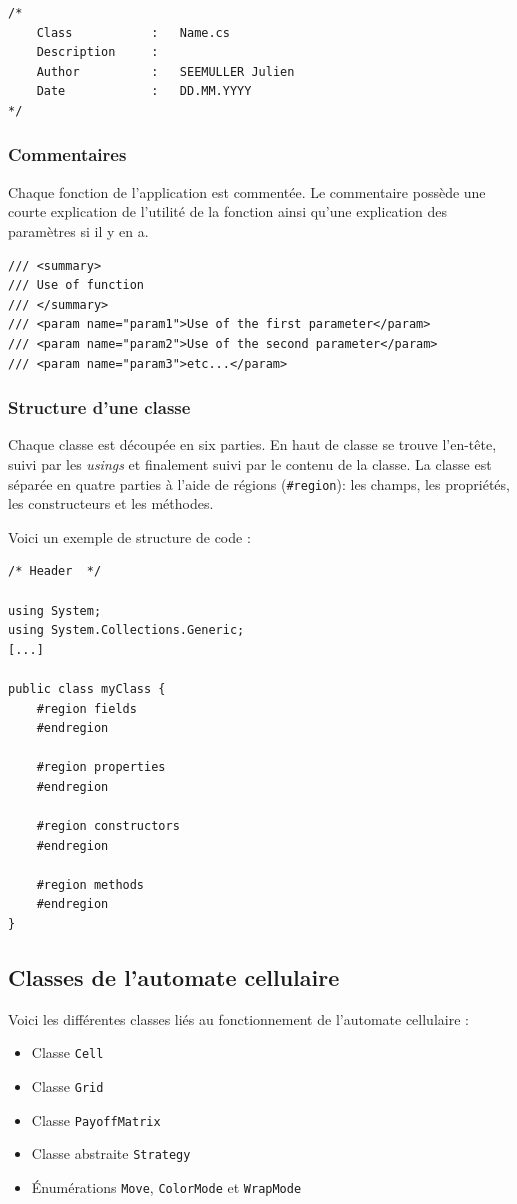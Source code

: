 \documentclass[a4paper]{article}
\begin{document}
\begin{lstlisting}
/*
    Class           :   Name.cs
    Description     :   
    Author          :   SEEMULLER Julien
    Date            :   DD.MM.YYYY
*/
\end{lstlisting}

\subsubsection{Commentaires}
Chaque fonction de l'application est commentée. Le commentaire possède une courte explication de l'utilité de la fonction ainsi qu'une explication des paramètres si il y en a.

\begin{lstlisting}
/// <summary>
/// Use of function
/// </summary>
/// <param name="param1">Use of the first parameter</param>
/// <param name="param2">Use of the second parameter</param>
/// <param name="param3">etc...</param>
\end{lstlisting}

\subsubsection{Structure d'une classe}
Chaque classe est découpée en six parties. En haut de classe se trouve l'en-tête, suivi par les \textit{usings} et finalement suivi par le contenu de la classe. La classe est séparée en quatre parties à l'aide de régions (\texttt{\#region}): les champs, les propriétés, les constructeurs et les méthodes.

Voici un exemple de structure de code :

\begin{lstlisting}
/* Header  */

using System;
using System.Collections.Generic;
[...]

public class myClass {
    #region fields
    #endregion
    
    #region properties
    #endregion
    
    #region constructors
    #endregion
    
    #region methods
    #endregion
}
\end{lstlisting}

\pagebreak
\subsection{Classes de l'automate cellulaire}
Voici les différentes classes liés au fonctionnement de l'automate cellulaire :
\begin{itemize}
    \item Classe \texttt{Cell}
    \item Classe \texttt{Grid}
    \item Classe \texttt{PayoffMatrix}
    \item Classe abstraite \texttt{Strategy}
    \item Énumérations \texttt{Move}, \texttt{ColorMode} et \texttt{WrapMode}
\end{itemize}
\end{document}
